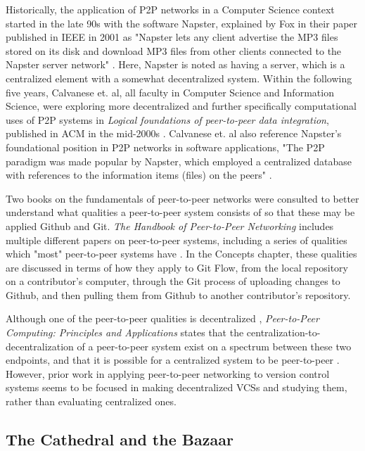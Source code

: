Historically, the application of P2P networks in a Computer Science context started in the late 90s with the software Napster, explained by Fox in their paper published in IEEE in 2001 as "Napster lets any client advertise the MP3 files stored on its disk and download MP3 files from other clients connected to the Napster server network" \cite{fox2001peer}. Here, Napster is noted as having a server, which is a centralized element with a somewhat decentralized system. Within the following five years, Calvanese et. al, all faculty in Computer Science and Information Science, were exploring more decentralized and further specifically computational uses of P2P systems in \textit{Logical foundations of peer-to-peer data integration}, published in ACM in the mid-2000s \cite{calvanese2004logical}. Calvanese et. al also reference Napster's foundational position in P2P networks in software applications, "The P2P paradigm was made popular by Napster, which employed a centralized database with references to the information items (files) on the peers" \cite{calvanese2004logical}. 

Two books on the fundamentals of peer-to-peer networks were consulted to better understand what qualities a peer-to-peer system consists of so that these may be applied Github and Git. \textit{The Handbook of Peer-to-Peer Networking} includes multiple different papers on peer-to-peer systems, including a series of qualities which "most" peer-to-peer systems have \cite{peertopeerhandbook}. In the Concepts chapter, these qualities are discussed in terms of how they apply to Git Flow, from the local repository on a contributor's computer, through the Git process of uploading changes to Github, and then pulling them from Github to another contributor's repository. 

Although one of the peer-to-peer qualities is decentralized \cite{peertopeerhandbook}, \textit{Peer-to-Peer Computing: Principles and Applications} states that the centralization-to-decentralization of a peer-to-peer system exist on a spectrum between these two endpoints, and that it is possible for a centralized system to be peer-to-peer \cite{peertopeercomputing}. However, prior work in applying peer-to-peer networking to version control systems seems to be focused in making decentralized VCSs and studying them, rather than evaluating centralized ones. 

\subsection{The Cathedral and the Bazaar}

